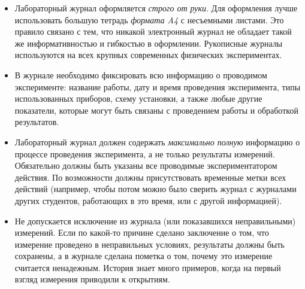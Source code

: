 \begin{itemize}
    \item Лабораторный журнал оформляется \emph{строго от руки}.
    Для оформления лучше использовать большую тетрадь \emph{формата A4}
    с несъемными листами. Это правило
связано с тем, что никакой электронный журнал не обладает такой же
информативностью и гибкостью в оформлении. Рукописные
журналы используются на всех крупных современных физических экспериментах.

    \item В журнале необходимо фиксировать всю информацию о проводимом
эксперименте: название работы, дату и время проведения эксперимента, типы
использованных приборов, схему установки, а также любые другие показатели,
которые могут быть связаны с проведением работы и обработкой результатов.


    \item Лабораторный журнал должен содержать \emph{максимально полную}
информацию о процессе проведения эксперимента, а не только результаты измерений.
Обязательно должны быть указаны все проводимые экспериментатором действия.
По возможности должны присутствовать временные метки всех
действий (например, чтобы потом можно было сверить журнал с журналами других
студентов, работающих в это время, или с другой информацией).


    \item Не допускается исключение из журнала  (или показавшихся
неправильными) измерений. Если по какой-то причине сделано заключение о том, что
измерение проведено в неправильных условиях, результаты должны быть сохранены, а
в журнале сделана пометка о том, почему это измерение считается ненадежным. 
История знает много примеров, когда на первый взгляд  измерения приводили к открытиям.


\end{itemize}

